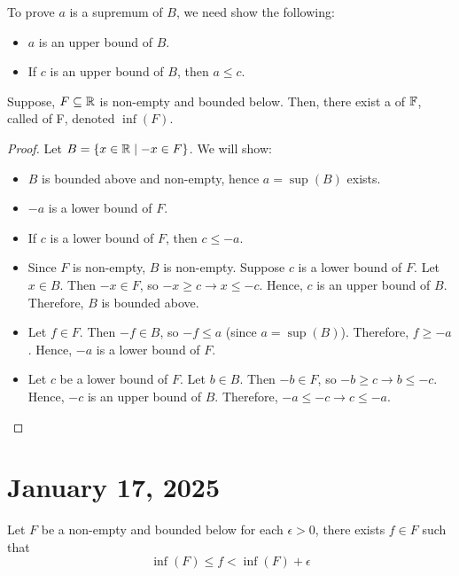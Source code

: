 \documentclass[11pt]{article}
\begin{document}
\begin{remark}
	To prove \(a\) is a supremum of \(B\), we need show the following:
	\begin{itemize}
		\item \(a\) is an upper bound of \(B\).
		\item If \(c\) is an upper bound of \(B\), then \(a \leqslant c\).
	\end{itemize}
\end{remark}

\begin{theorem}
	Suppose, \(F \subseteq \mathbb R\) is non-empty and bounded below. Then, there exist a  of \(\mathbb F\), called  of F, denoted \(\inf(F)\).
\end{theorem}
\begin{proof}
	Let \(B = \{x \in \mathbb R \mid -x \in F\}\). We will show:
	\begin{itemize}
		\item \(B\) is bounded above and non-empty, hence \(a = \sup(B)\) exists.
		\item \(-a\) is a lower bound of \(F\).
		\item If \(c\) is a lower bound of \(F\), then \(c \leqslant -a\).
	\end{itemize}
	\begin{itemize}
		\item Since \(F\) is non-empty, \(B\) is non-empty. Suppose \(c\) is a lower bound of
		      \(F\). Let \(x \in B\). Then \(-x \in F\), so \(-x \geqslant c \rightarrow x
		      \leqslant -c\). Hence, \(c\) is an upper bound of \(B\). Therefore, \(B\) is
		      bounded above.
		\item Let \(f \in F\). Then \(-f \in B\), so \(-f \leq a\) (since \(a = \sup(B)\)).
		      Therefore, \(f \geq -a\). Hence, \(-a\) is a lower bound of \(F\).
		\item Let \(c\) be a lower bound of \(F\). Let \(b \in B\). Then \(-b \in F\), so
		      \(-b \geq c \rightarrow b \leq -c\). Hence, \(-c\) is an upper bound of \(B\).
		      Therefore, \(-a \leq -c \rightarrow c \leq -a\).
	\end{itemize}
\end{proof}
\section{January 17, 2025}
\begin{corollary}
	Let \(F\) be a non-empty and bounded below for each \(\epsilon > 0\), there exists \(f \in F\) such that \[ \inf (F) \leqslant f < \inf(F) + \epsilon\]
\end{corollary}
\end{document}
